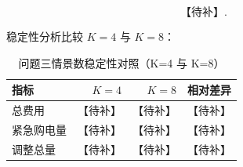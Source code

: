 \[
\text{【待补】}.
\]

稳定性分析比较 \(K=4\) 与 \(K=8\)：

\begin{table}[H]
\centering
{}
\begin{tabular}{lrrr}
\toprule
指标 & \(K=4\) & \(K=8\) & 相对差异 \\
\midrule
总费用 & 【待补】 & 【待补】 & 【待补】 \\
紧急购电量 & 【待补】 & 【待补】 & 【待补】 \\
调整总量 & 【待补】 & 【待补】 & 【待补】 \\
\bottomrule
\end{tabular}
\caption{问题三情景数稳定性对照（K=4 与 K=8）}
\label{tab:10}
\end{table}
